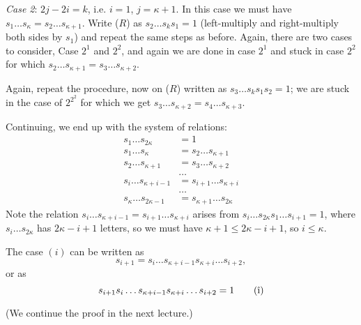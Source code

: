 {\em Case 2}: $2j-2i=k$, i.e. $i=1$, $j=\kappa+1$. In this case we must have
$s_1 \dots s_\kappa = s_2 \dots s_{\kappa+1}$. Write ($R$) as
$s_2 \dots s_k s_1 = 1$ (left-multiply and right-multiply both sides by $s_1$)
and repeat the same steps as before. Again, there are two cases to consider,
Case $2^1$ and $2^2$, and again we are done in case $2^1$ and stuck in case
$2^2$ for which $s_2 \dots s_{\kappa+1} = s_3 \dots s_{\kappa+2}$.

Again, repeat the procedure, now on ($R$) written as $s_3 \dots s_k s_1 s_2 = 1$;
we are stuck in the case of $2^{2^2}$ for which we get $s_3 \dots s_{\kappa+2}
= s_4 \dots s_{\kappa+3}$.

Continuing, we end up with the system of relations:
\begin{align*}
    s_1 \dots s_{2 \kappa} &= 1 \tag{$R$} \\
    s_1 \dots s_{\kappa} &= s_2 \dots s_{\kappa+1}
    \tag{1 \textasteriskcentered\textasteriskcentered}\\
    s_2 \dots s_{\kappa+1} &= s_3 \dots s_{\kappa+2}
    \tag{2 \textasteriskcentered\textasteriskcentered}\\
    & \dots \\
    s_i \dots s_{\kappa+i-1} &= s_{i+1} \dots s_{\kappa+i}
    \tag{$i$ \textasteriskcentered\textasteriskcentered}\\
    & \dots \\
    s_\kappa \dots s_{2\kappa-1} &= s_{\kappa+1} \dots s_{2\kappa}
    \tag{$\kappa$ \textasteriskcentered\textasteriskcentered}
\end{align*}
Note the relation $s_i \dots s_{\kappa+i-1} = s_{i+1} \dots s_{\kappa+i}$ arises
from $s_i \dots s_{2\kappa} s_1 \dots s_{i+1} = 1$,
where $s_i \dots s_{2\kappa}$ has $2\kappa-i+1$ letters, so
we must have $\kappa+1 \leq 2\kappa-i+1$, so $i \leq \kappa$.

The case $(i)$ can be written as
\[
    s_{i+1} = s_i \dots s_{\kappa+i-1} s_{\kappa+i} \dots s_{i+2},
\]
or as
\begin{equation} \label{thm14b}
    s_{i+1} s_i \dots s_{\kappa+i-1} s_{\kappa+i} \dots s_{i+2} = 1
    \tag{\^{i}}
\end{equation}

(We continue the proof in the next lecture.)

